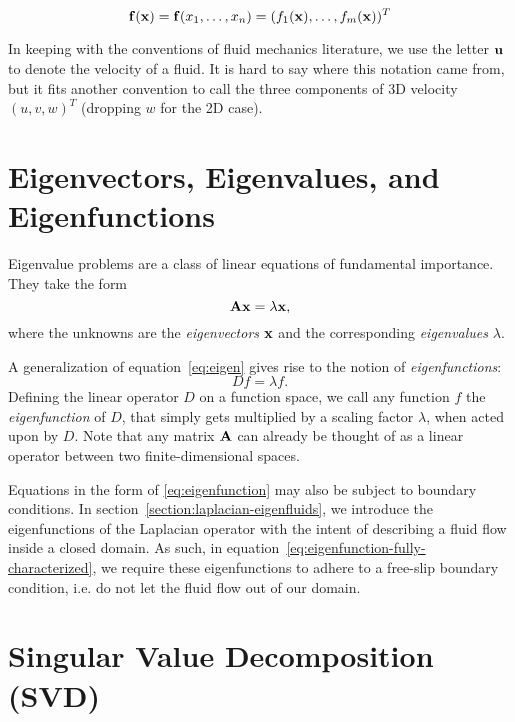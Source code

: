 $$\vb{f}(\vb{x}) = \vb{f}(x_1,\dots, x_n) =
(f_1(\vb{x}), \dots, f_m(\vb{x}))^T$$

In keeping with the conventions of fluid mechanics literature, we use the letter
$\vb{u}$ to denote the velocity of a fluid. It is hard to say where this
notation came from, but it fits another convention to call the three components
of 3D velocity $(u, v, w)^T$ (dropping $w$ for the 2D case).

\section{Eigenvectors, Eigenvalues, and Eigenfunctions}
Eigenvalue problems are a class of linear equations of fundamental importance.
They take the form
\begin{equation}\label{eq:eigen}
    \vb{A}\vb{x} = \lambda\vb{x},
\end{equation}
where the unknowns are the \textit{eigenvectors} $\vb{x}$ and the corresponding
\textit{eigenvalues} $\lambda$.


A generalization of equation~\ref{eq:eigen} gives rise to the notion of
\textit{eigenfunctions}:
\begin{equation}\label{eq:eigenfunction}
    D f = \lambda f.
\end{equation}
Defining the linear operator $D$ on a function space, we call any 
function $f$ the \textit{eigenfunction} of $D$, that simply gets multiplied by a
scaling factor $\lambda$, when acted upon by $D$. Note that any matrix
$\vb{A}$ can already be thought of as a linear operator between two
finite-dimensional spaces.

Equations in the form of \ref{eq:eigenfunction} may also be subject to
boundary conditions. In section~\ref{section:laplacian-eigenfluids}, we
introduce the eigenfunctions of the Laplacian operator with the intent of
describing a fluid flow inside a closed domain. As such, in
equation~\ref{eq:eigenfunction-fully-characterized}, we require these
eigenfunctions to adhere to a free-slip boundary condition, i.e. do not let the
fluid flow out of our domain.

\section{Singular Value Decomposition (SVD)}


